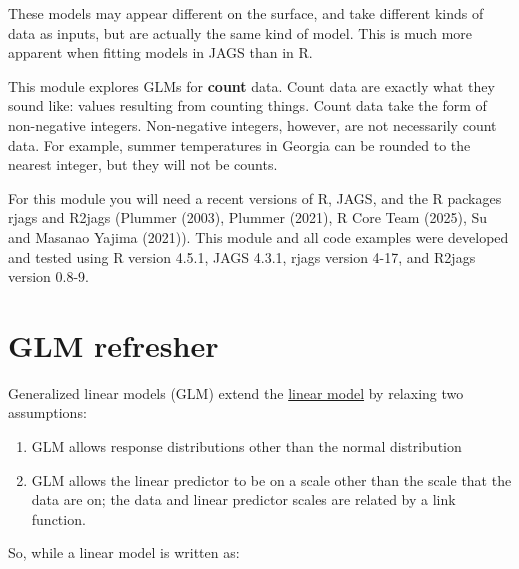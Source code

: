 \documentclass[
  13,
  letterpaper,
]{report}
\providecommand{\tightlist}{%
  \setlength{\itemsep}{0pt}\setlength{\parskip}{0pt}}
\begin{document}
These models may appear different on the surface, and take different
kinds of data as inputs, but are actually the same kind of model. This
is much more apparent when fitting models in JAGS than in R.

This module explores GLMs for \textbf{count} data. Count data are
exactly what they sound like: values resulting from counting things.
Count data take the form of non-negative integers. Non-negative
integers, however, are not necessarily count data. For example, summer
temperatures in Georgia can be rounded to the nearest integer, but they
will not be counts.

\begin{tcolorbox}[enhanced jigsaw, arc=.35mm, bottomrule=.15mm, bottomtitle=1mm, breakable, colback=white, colbacktitle=quarto-callout-note-color!10!white, colframe=quarto-callout-note-color-frame, coltitle=black, left=2mm, leftrule=.75mm, opacityback=0, opacitybacktitle=0.6, rightrule=.15mm, title=\textcolor{quarto-callout-note-color}{\faInfo}\hspace{0.5em}{About this module}, titlerule=0mm, toprule=.15mm, toptitle=1mm]

For this module you will need a recent versions of R, JAGS, and the R
packages rjags and R2jags (Plummer (2003), Plummer (2021), R Core Team
(2025), Su and Masanao Yajima (2021)). This module and all code examples
were developed and tested using R version 4.5.1, JAGS 4.3.1, rjags
version 4-17, and R2jags version 0.8-9.

\end{tcolorbox}

\section{GLM refresher}\label{sec-glm1-review}

Generalized linear models (GLM) extend the
\href{\%7B@sec-linear\%7D}{linear model} by relaxing two assumptions:

\begin{enumerate}
\def\labelenumi{\arabic{enumi}.}
\tightlist
\item
  GLM allows response distributions other than the normal distribution
\item
  GLM allows the linear predictor to be on a scale other than the scale
  that the data are on; the data and linear predictor scales are related
  by a link function.
\end{enumerate}

So, while a linear model is written as:
\end{document}
